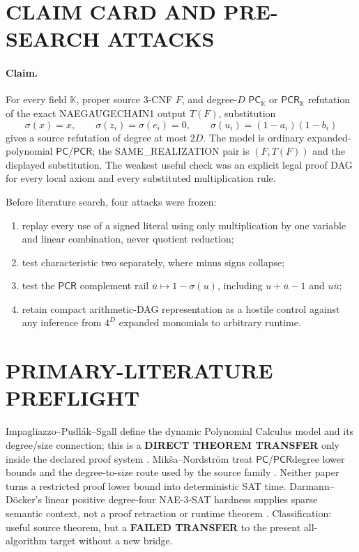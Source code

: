 \documentclass[11pt]{article}
\newcommand{\PC}{\ensuremath{\mathsf{PC}}}
\newcommand{\PCR}{\ensuremath{\mathsf{PCR}}}
\begin{document}
\section{CLAIM CARD AND PRE-SEARCH ATTACKS}
\paragraph{Claim.}  For every field $\mathbb K$, proper source 3-CNF $F$, and
degree-$D$ \PC$_\mathbb K$ or \PCR$_\mathbb K$ refutation of the exact
NAEGAUGECHAIN1 output $T(F)$, substitution
\[
\sigma(x)=x,\qquad \sigma(z_i)=\sigma(e_i)=0,
\qquad \sigma(u_i)=(1-a_i)(1-b_i)
\]
gives a source refutation of degree at most $2D$.  The model is ordinary
expanded-polynomial \PC/\PCR; the SAME\_REALIZATION pair is $(F,T(F))$ and
the displayed substitution.  The weakest useful check was an explicit legal
proof DAG for every local axiom and every substituted multiplication rule.

Before literature search, four attacks were frozen:
\begin{enumerate}
\item replay every use of a signed literal using only multiplication by one
variable and linear combination, never quotient reduction;
\item test characteristic two separately, where minus signs collapse;
\item test the \PCR{} complement rail $\bar u\mapsto1-\sigma(u)$, including
$u+\bar u-1$ and $u\bar u$;
\item retain compact arithmetic-DAG representation as a hostile control
against any inference from $4^D$ expanded monomials to arbitrary runtime.
\end{enumerate}

\section{PRIMARY-LITERATURE PREFLIGHT}
Impagliazzo--Pudl\'ak--Sgall define the dynamic Polynomial Calculus model and
its degree/size connection; this is a \textbf{DIRECT THEOREM TRANSFER} only
inside the declared proof system \cite{IPS99}.  Mik\v{s}a--Nordstr\"om treat
\PC/\PCR degree lower bounds and the degree-to-size route used by the source
family \cite{MN15}.  Neither paper turns a restricted proof lower bound into
deterministic SAT time.  Darmann--D\"ocker's linear positive degree-four
NAE-3-SAT hardness supplies sparse semantic context, not a proof retraction
or runtime theorem \cite{DD20}.  Classification: useful source theorem, but a
\textbf{FAILED TRANSFER} to the present all-algorithm target without a new
bridge.
\end{document}
